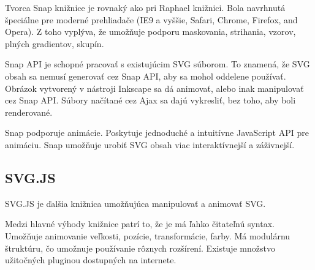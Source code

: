 Tvorca Snap knižnice je rovnaký ako pri Raphael knižnici.  Bola navrhnutá špeciálne pre moderné prehliadače (IE9 a vyššie, Safari, Chrome, Firefox, and Opera). Z toho vyplýva, že umožňuje podporu maskovania, strihania, vzorov, plných gradientov, skupín. 

Snap API je schopné pracovať s existujúcim SVG súborom. To znamená, že SVG obsah sa nemusí  generovať cez Snap API, aby sa mohol oddelene používať. Obrázok vytvorený v nástroji  Inkscape sa dá animovať, alebo inak manipulovať cez Snap API.
Súbory načítané cez Ajax sa dajú vykresliť, bez toho, aby boli renderované. 


Snap podporuje animácie. Poskytuje jednoduché a intuitívne JavaScript API pre animáciu. Snap umožňuje urobiť SVG obsah viac interaktívnejší a záživnejší. \cite{snapsvg}





\subsection{SVG.JS}

SVG.JS je ďalšia knižnica umožňujúca manipulovať a animovať SVG.

Medzi hlavné výhody knižnice patrí to, že je má ľahko čitateľnú syntax. Umožňuje animovanie veľkosti, pozície, transformácie, farby. Má modulárnu štruktúru, čo umožnuje používanie rôznych rozšírení. Existuje množstvo užitočných pluginou dostupných na internete. \cite{svgjs}

